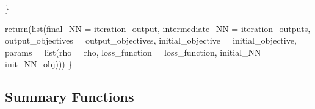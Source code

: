 \documentclass[
]{book}
\newenvironment{Shaded}{\begin{snugshade}}{\end{snugshade}}
\newcommand{\AttributeTok}[1]{\textcolor[rgb]{0.77,0.63,0.00}{#1}}
\newcommand{\FunctionTok}[1]{\textcolor[rgb]{0.00,0.00,0.00}{#1}}
\newcommand{\NormalTok}[1]{#1}
\begin{document}
\begin{Shaded}
\begin{Highlighting}[]
\NormalTok{  \}}
  
  \FunctionTok{return}\NormalTok{(}\FunctionTok{list}\NormalTok{(}\AttributeTok{final\_NN =}\NormalTok{ iteration\_output,}
              \AttributeTok{intermediate\_NN =}\NormalTok{ iteration\_outputs,}
              \AttributeTok{output\_objectives =}\NormalTok{ output\_objectives,}
              \AttributeTok{initial\_objective =}\NormalTok{ initial\_objective,}
              \AttributeTok{params =} \FunctionTok{list}\NormalTok{(}\AttributeTok{rho =}\NormalTok{ rho,}
                            \AttributeTok{loss\_function =}\NormalTok{ loss\_function,}
                            \AttributeTok{initial\_NN =}\NormalTok{ init\_NN\_obj)))}
\NormalTok{\}}
\end{Highlighting}
\end{Shaded}

\hypertarget{summary-functions}{%
\subsection{Summary Functions}\label{summary-functions}}
\end{document}
